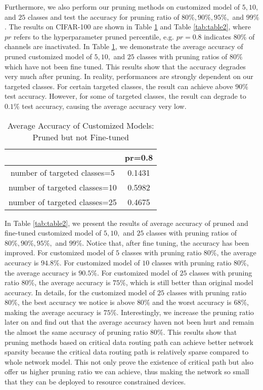 \documentclass[conference]{IEEEtran}
\begin{document}
Furthermore, we also perform our pruning methods on customized model of $5, 10, $ and $25$ classes and test the accuracy for pruning ratio of $80\%, 90\%, 95\%, $ and $99\%$. The results on CIFAR-100 are shown in Table \ref{tab:table1} and Table \ref{tab:table2}, where $pr$ refers to the hyperparameter pruned percentile, e.g. $pr=0.8$ indicates 80\% of channels are inactivated. In Table \ref{tab:table1}, we demonstrate the average accuracy of pruned customized model of $5, 10, $ and $25$ classes with pruning ratios of $80\%$ which have not been fine tuned. This results show that the accuracy degrades very much after pruning. In reality, performances are strongly
dependent on our targeted classes. For certain targeted classes, the result can achieve above $90\%$ test accuracy. However, for some of targeted classes, the result can degrade to $0.1\%$ test accuracy, causing the average accuracy very low.

\begin{table}[htb!]
	\centering
	\caption{Average Accuracy of Customized Models: Pruned but not Fine-tuned}
	\label{tab:table1}
    \begin{tabular}{|c|c|}
    	\hline
    	& pr=0.8\\ \hline
    	number of targeted classes=5 & 0.1431\\ \hline
    	number of targeted classes=10 & 0.5982\\ \hline
    	number of targeted classes=25 & 0.4675\\ \hline
    \end{tabular}
\end{table}
In Table \ref{tab:table2}, we present the results of average accuracy of pruned and fine-tuned customized model of $5, 10, $ and $25$ classes with pruning ratios of $80\%, 90\%, 95\%, $ and $99\%$. Notice that, after fine tuning, the accuracy has been improved. For customized model of $5$ classes with pruning ratio $80\%$, the average accuracy is $94.8\%$. For customized model of $10$ classes with pruning ratio $80\%$, the average accuracy is $90.5\%$. For customized model of $25$ classes with pruning ratio $80\%$, the average accuracy is $75\%$, which is still better than original model accuracy. In details, for the customized model of $25$ classes with pruning ratio $80\%$, the best accuracy we notice is above $80\%$ and the worst accuracy is $68\%$, making the average accuracy is $75\%$. Interestingly, we increase the pruning ratio later on and find out that the average accuracy haven not been hurt and remain the almost the same accuracy of pruning ratio $80\%$. This results show that pruning methods based on critical data routing path can achieve better network sparsity because the critical data routing path is relatively sparse compared to whole network model. This not only prove the existence of critical path but also offer us higher pruning ratio we can achieve, thus making the network so small that they can be deployed to resource constrained devices.
\end{document}
